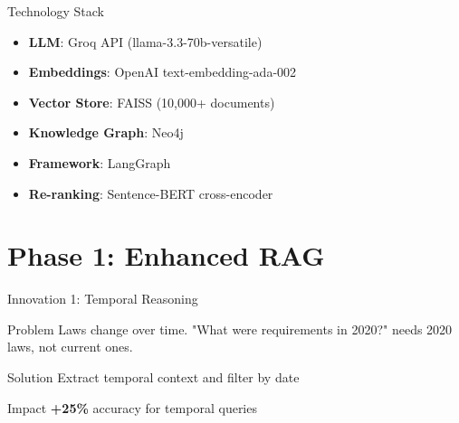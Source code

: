 \documentclass{beamer}
\begin{document}
\begin{frame}{Technology Stack}
\begin{itemize}
    \item \textbf{LLM}: Groq API (llama-3.3-70b-versatile)
    \item \textbf{Embeddings}: OpenAI text-embedding-ada-002
    \item \textbf{Vector Store}: FAISS (10,000+ documents)
    \item \textbf{Knowledge Graph}: Neo4j
    \item \textbf{Framework}: LangGraph
    \item \textbf{Re-ranking}: Sentence-BERT cross-encoder
\end{itemize}
\end{frame}

\section{Phase 1: Enhanced RAG}

\begin{frame}{Innovation 1: Temporal Reasoning}
\begin{block}{Problem}
Laws change over time. "What were requirements in 2020?" needs 2020 laws, not current ones.
\end{block}

\begin{block}{Solution}
Extract temporal context and filter by date
\end{block}

\begin{exampleblock}{Impact}
\textbf{+25\%} accuracy for temporal queries
\end{exampleblock}
\end{frame}
\end{document}
